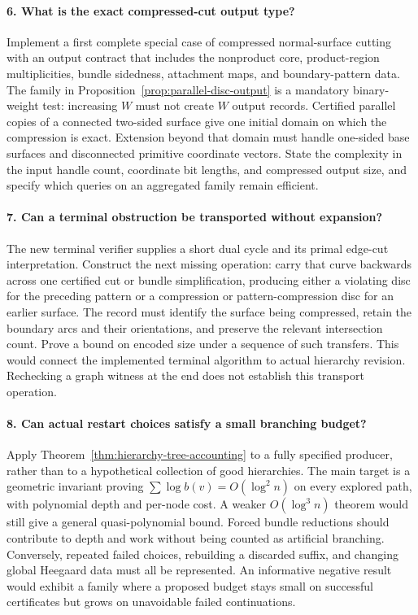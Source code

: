 \paragraph{6. What is the exact compressed-cut output type?}
Implement a first complete special case of compressed normal-surface
cutting with an output contract that includes the nonproduct core,
product-region multiplicities, bundle sidedness, attachment maps, and
boundary-pattern data.  The family in
Proposition~\ref{prop:parallel-disc-output} is a mandatory binary-weight
test: increasing $W$ must not create $W$ output records.
Certified parallel copies of a connected two-sided surface give one
initial domain on which the compression is exact.  Extension beyond
that domain must handle one-sided base surfaces and disconnected
primitive coordinate vectors.  State the complexity in the input handle
count, coordinate bit lengths, and compressed output size, and specify
which queries on an aggregated family remain efficient.

\paragraph{7. Can a terminal obstruction be transported without expansion?}
The new terminal verifier supplies a short dual cycle and its primal
edge-cut interpretation.  Construct the next missing operation: carry
that curve backwards across one certified cut or bundle simplification,
producing either a violating disc for the preceding pattern or a
compression or pattern-compression disc for an earlier surface.
The record must identify the surface being compressed, retain the
boundary arcs and their orientations, and preserve the relevant
intersection count.  Prove a bound on encoded size under a sequence of
such transfers.  This would connect the implemented terminal algorithm
to actual hierarchy revision.  Rechecking a graph witness at the end
does not establish this transport operation.

\paragraph{8. Can actual restart choices satisfy a small branching budget?}
Apply Theorem~\ref{thm:hierarchy-tree-accounting} to a fully specified
producer, rather than to a hypothetical collection of good hierarchies.
The main target is a geometric invariant proving
$\sum\log b(v)=O(\log^2 n)$ on every explored path, with polynomial
depth and per-node cost.  A weaker $O(\log^3 n)$ theorem would still
give a general quasi-polynomial bound.  Forced bundle reductions should
contribute to depth and work without being counted as artificial
branching.  Conversely, repeated failed choices, rebuilding a discarded
suffix, and changing global Heegaard data must all be represented.
An informative negative result would exhibit a family where a proposed
budget stays small on successful certificates but grows on unavoidable
failed continuations.


